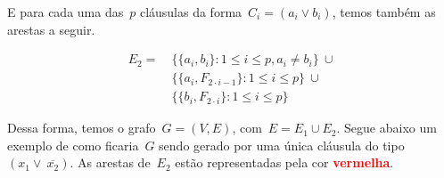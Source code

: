 		E para cada uma das~$p$ cláusulas da forma~$C_i=(a_i\lor b_i)$, 
		temos também as arestas a seguir.

		\begin{align}
			E_2= \ &\{ \{a_i,b_i\}: 1\le i\le p, a_i\ne b_i \}\ \cup 
					\nonumber\\
				&\{\{a_i, F_{2\cdot i-1}\}: 1\le i\le p\}\ \cup \nonumber \\
				&\{\{b_i, F_{2\cdot i}\}: 1\le i\le p\} \nonumber
		\end{align}

		Dessa forma, temos o grafo~${G = (V,E)}$, com~${E=E_1\cup E_2}$.
		Segue abaixo um exemplo de como ficaria~$G$ sendo gerado por
		uma única cláusula do tipo~${(x_1\lor\ \overline{x_2})}$.
		As arestas de~$E_2$ estão representadas pela cor 
		\textcolor{red}{\textbf {vermelha}}.

		\bigskip
		\bigskip

